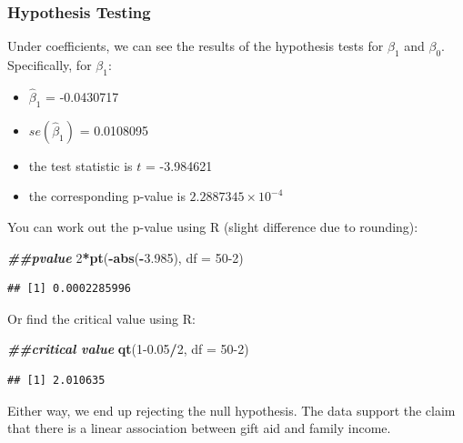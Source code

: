 \documentclass[
]{book}
\newenvironment{Shaded}{\begin{snugshade}}{\end{snugshade}}
\newcommand{\AttributeTok}[1]{\textcolor[rgb]{0.13,0.29,0.53}{#1}}
\newcommand{\DecValTok}[1]{\textcolor[rgb]{0.00,0.00,0.81}{#1}}
\newcommand{\DocumentationTok}[1]{\textcolor[rgb]{0.56,0.35,0.01}{\textbf{\textit{#1}}}}
\newcommand{\FloatTok}[1]{\textcolor[rgb]{0.00,0.00,0.81}{#1}}
\newcommand{\FunctionTok}[1]{\textcolor[rgb]{0.13,0.29,0.53}{\textbf{#1}}}
\newcommand{\NormalTok}[1]{#1}
\newcommand{\SpecialCharTok}[1]{\textcolor[rgb]{0.81,0.36,0.00}{\textbf{#1}}}
\providecommand{\tightlist}{%
  \setlength{\itemsep}{0pt}\setlength{\parskip}{0pt}}
\begin{document}
\hypertarget{hypothesis-testing-2}{%
\subsubsection*{Hypothesis Testing}\label{hypothesis-testing-2}}

Under coefficients, we can see the results of the hypothesis tests for \(\beta_1\) and \(\beta_0\). Specifically, for \(\beta_1\):

\begin{itemize}
\tightlist
\item
  \(\hat{\beta}_1\) = -0.0430717
\item
  \(se(\hat{\beta}_1)\) = 0.0108095
\item
  the test statistic is \(t\) = -3.984621
\item
  the corresponding p-value is \ensuremath{2.2887345\times 10^{-4}}
\end{itemize}

You can work out the p-value using R (slight difference due to rounding):

\begin{Shaded}
\begin{Highlighting}[]
\DocumentationTok{\#\#pvalue}
\DecValTok{2}\SpecialCharTok{*}\FunctionTok{pt}\NormalTok{(}\SpecialCharTok{{-}}\FunctionTok{abs}\NormalTok{(}\SpecialCharTok{{-}}\FloatTok{3.985}\NormalTok{), }\AttributeTok{df =} \DecValTok{50{-}2}\NormalTok{)}
\end{Highlighting}
\end{Shaded}

\begin{verbatim}
## [1] 0.0002285996
\end{verbatim}

Or find the critical value using R:

\begin{Shaded}
\begin{Highlighting}[]
\DocumentationTok{\#\#critical value}
\FunctionTok{qt}\NormalTok{(}\DecValTok{1}\FloatTok{{-}0.05}\SpecialCharTok{/}\DecValTok{2}\NormalTok{, }\AttributeTok{df =} \DecValTok{50{-}2}\NormalTok{)}
\end{Highlighting}
\end{Shaded}

\begin{verbatim}
## [1] 2.010635
\end{verbatim}

Either way, we end up rejecting the null hypothesis. The data support the claim that there is a linear association between gift aid and family income.
\end{document}
